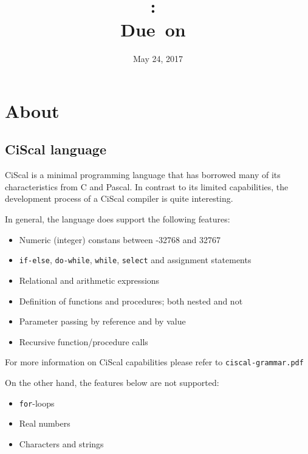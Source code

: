 \documentclass{article}
\title{
\vspace{2in}
\textmd{\textbf{\hmwkClass:\ \hmwkTitle}}\\
\normalsize\vspace{0.1in}\small{Due\ on\ \hmwkDueDate}\\
\vspace{0.1in}\large{\textit{\hmwkClassInstructor}}
\vspace{3in}
}
\author{\textbf{\hmwkAuthorName}}
\date{May 24, 2017} %
\def\code#1{\texttt{#1}} %
\begin{document}
\maketitle


\newpage
\tableofcontents
\newpage


\section{About}

\subsection{CiScal language}
CiScal is a minimal programming language that has borrowed many of its characteristics from C and Pascal.
In contrast to its limited capabilities, the development process of a CiScal compiler is quite interesting.

In general, the language does support the following features:
\begin{itemize}
 \item Numeric (integer) constans between -32768 and 32767
 \item \code{if-else}, \code{do-while}, \code{while}, \code{select} and assignment statements
 \item Relational and arithmetic expressions
 \item Definition of functions and procedures; both nested and not
 \item Parameter passing by reference and by value
 \item Recursive function/procedure calls
\end{itemize}

For more information on CiScal capabilities please refer to \code{ciscal-grammar.pdf}

\vspace{0.5cm}
On the other hand, the features below are not supported:
\begin{itemize}
 \item \code{for}-loops
 \item Real numbers
 \item Characters and strings
\end{itemize}
\end{document}
